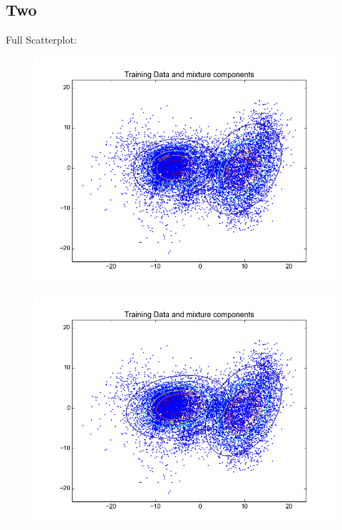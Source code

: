 \documentclass[11pt,a4paper]{article}
\begin{document}
\subsection{Two}
Full Scatterplot: \\
\begin{minipage}[b]{0.25\textwidth}
\begin{figure}[H]
  \centering
  \includegraphics[width=.8\linewidth]{Figures/contours_digittwo0.png}
  \label{fig:sfig1}
\end{figure}%
\end{minipage}
\begin{minipage}[b]{0.25\textwidth}
\begin{figure}[H]
  \centering
  \includegraphics[width=.8\linewidth]{Figures/contours_digittwo5.png}

  \label{fig:sfig1}
\end{figure}%
\end{minipage}
\end{document}
